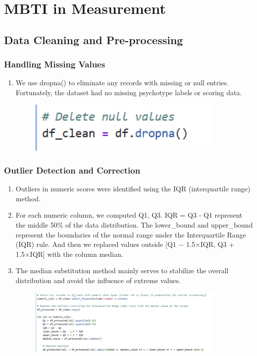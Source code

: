 \documentclass[12pt]{article}
\begin{document}
	\section{MBTI in Measurement} %
	\subsection{Data Cleaning and Pre-processing}
	\subsubsection{Handling Missing Values}
	\begin{enumerate}
		\item We use dropna() to eliminate any records with missing or null entries. Fortunately, the dataset had no missing psychotype labels or scoring data.
			\begin{figure}[H]
			\centering
			\includegraphics[width=0.9\textwidth]{Q1P4}
			
		\end{figure}
	\end{enumerate}
	\subsubsection{Outlier Detection and Correction}
	\begin{enumerate}
		\item Outliers in numeric scores were identified using the IQR (interquartile range) method.
		\item For each numeric column, we computed Q1, Q3. IQR = Q3 - Q1 represent the middle 50\% of the data distribution. The lower\_bound and upper\_bound represent the boundaries of the normal range under the Interquartile Range (IQR) rule. And then we replaced values outside [Q1 − 1.5×IQR, Q3 + 1.5×IQR] with the column median. 
		\item The median substitution method mainly serves to stabilize the overall distribution and avoid the influence of extreme values.
		\begin{figure}[H]
			\centering
			\includegraphics[width=0.9\textwidth]{Q1P5}
			
		\end{figure}
	\end{enumerate}
\end{document}
